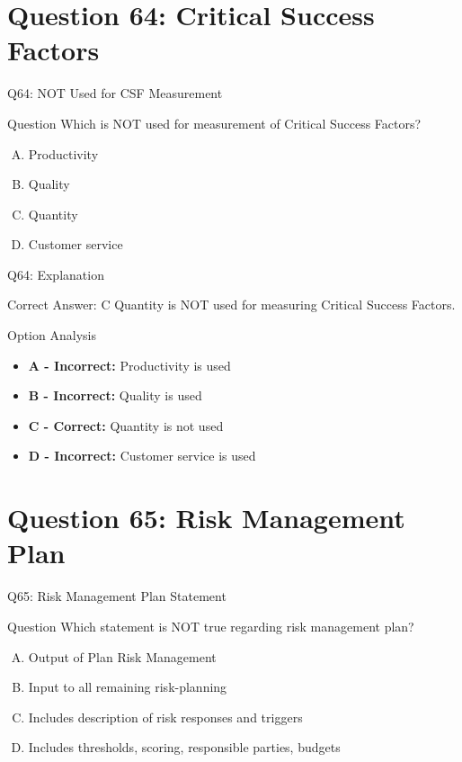 \documentclass{beamer}
\begin{document}
	\section{Question 64: Critical Success Factors}
	
	\begin{frame}{Q64: NOT Used for CSF Measurement}
		\begin{block}{Question}
			Which is NOT used for measurement of Critical Success Factors?
		\end{block}
		\begin{enumerate}[(A)]
			\item Productivity
			\item Quality
			\item Quantity
			\item Customer service
		\end{enumerate}
	\end{frame}
	
	\begin{frame}{Q64: Explanation}
		\begin{block}{Correct Answer: C}
			Quantity is NOT used for measuring Critical Success Factors.
		\end{block}
		\begin{block}{Option Analysis}
			\begin{itemize}
				\item \textbf{A - Incorrect:} Productivity is used
				\item \textbf{B - Incorrect:} Quality is used
				\item \textbf{C - Correct:} Quantity is not used
				\item \textbf{D - Incorrect:} Customer service is used
			\end{itemize}
		\end{block}
	\end{frame}
	
	\section{Question 65: Risk Management Plan}
	
	\begin{frame}{Q65: Risk Management Plan Statement}
		\begin{block}{Question}
			Which statement is NOT true regarding risk management plan?
		\end{block}
		\begin{enumerate}[(A)]
			\item Output of Plan Risk Management
			\item Input to all remaining risk-planning
			\item Includes description of risk responses and triggers
			\item Includes thresholds, scoring, responsible parties, budgets
		\end{enumerate}
	\end{frame}
	
\end{document}
